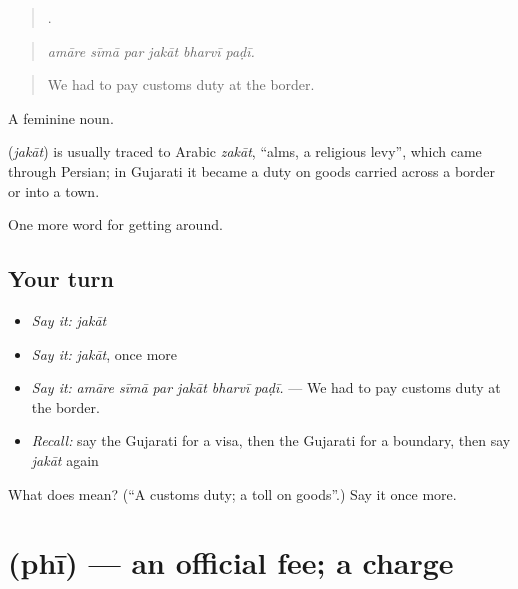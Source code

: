 \begin{quote}
     .
\end{quote}

\begin{quote}
\emph{amāre sīmā par jakāt bharvī paḍī.}
\end{quote}

\begin{quote}
We had to pay customs duty at the border.
\end{quote}

A feminine noun.

\begin{cousinweb}
\textbf{} (\emph{jakāt}) is usually traced to Arabic \emph{zakāt}, \textquotedblleft{}alms, a religious levy\textquotedblright{}, which came through Persian; in Gujarati it became a duty on goods carried across a border or into a town.
\end{cousinweb}

\begin{grammarlens}[title={What you've built}]
One more word for getting around.
\end{grammarlens}

\subsection*{Your turn}
\begin{itemize}
\raggedright
  \item \emph{Say it:} \emph{jakāt}
  \item \emph{Say it:} \emph{jakāt}, once more
  \item \emph{Say it:} \emph{amāre sīmā par jakāt bharvī paḍī.} — We had to pay customs duty at the border.
  \item \emph{Recall:} say the Gujarati for a visa, then the Gujarati for a boundary, then say \emph{jakāt} again
\end{itemize}

\begin{tcolorbox}[breakable,colback=teal!4,colframe=teal!35!black,title={Before you move on}]
What does  mean? (\textquotedblleft{}A customs duty; a toll on goods\textquotedblright{}.) Say it once more.
\end{tcolorbox}
\section[\texorpdfstring{\gu{ફી} (phī)}{ફી (phī)}]{ (phī) — an official fee; a charge}

